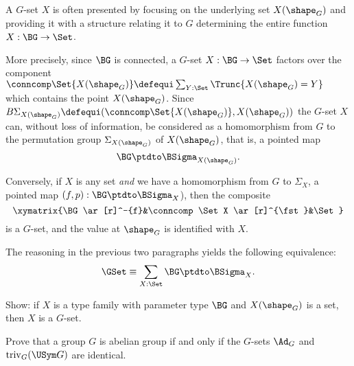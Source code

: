 \begin{remark}
  \label{remark:GsetsareGsets}
  A $G$-set $X$ is often presented by focusing on the underlying set $X(\shape_G)$
and providing it with a structure relating it to $G$ determining
the entire function $X : \BG\to\Set$.

More precisely, since $\BG$ is connected, a $G$-set $X : \BG\to\Set$ factors
over the component $\conncomp \Set {X(\shape_G)} \defequi \sum_{Y:\Set}\Trunc{X(\shape_G)=Y}$
which contains the point $X(\shape_G)$.
Since $B\Sigma_{X(\shape_G)}\defequi(\conncomp \Set {X(\shape_G)},X(\shape_G))$ the $G$-set $X$ can,
without loss of information, be considered as a homomorphism from $G$ to
the permutation group $\Sigma_{X(\shape_G)}$ of $X(\shape_G)$,
that is, a pointed map
$$\BG\ptdto\BSigma_{X(\shape_G)}.$$

Conversely, if $X$ is any set \emph{and} we have a homomorphism
from $G$ to $\Sigma_X$, \ie a pointed map $(f,p) : \BG\ptdto \BSigma_{X}$),
then the composite
$$\xymatrix{\BG\ar[r]^-{f}&\conncomp \Set X \ar[r]^{\fst}&\Set}$$
is a $G$-set, and the value at $\shape_G$ is identified with $X$.

The reasoning in the previous two paragraphs yields the following equivalence:
\[
\GSet \equiv \sum_{X:\Set} \BG \ptdto \BSigma_X.
\]
\end{remark}

\begin{xca}
Show:  if $X$ is a type family with parameter type $\BG$ and $X(\shape_G)$ is a set,
then $X$ is a $G$-set.
\end{xca}

\begin{xca}
  Prove that a group $G$ is abelian group if and only if the $G$-sets $\Ad_G$ and $\mathrm{triv}_G(\USym G)$ are identical.
\end{xca}

